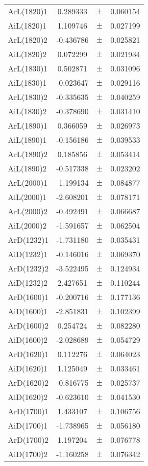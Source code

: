 \begin{table}
\begin{tiny}
\begin{tabular}{lccc}
ArL(1820)1 & 0.289333 & $\pm$ & 0.060154 \\
AiL(1820)1 & 1.109746 & $\pm$ & 0.027199 \\
ArL(1820)2 & -0.436786 & $\pm$ & 0.025821 \\
AiL(1820)2 & 0.072299 & $\pm$ & 0.021934 \\
ArL(1830)1 & 0.502871 & $\pm$ & 0.031096 \\
AiL(1830)1 & -0.023647 & $\pm$ & 0.029116 \\
ArL(1830)2 & -0.335635 & $\pm$ & 0.040259 \\
AiL(1830)2 & -0.378690 & $\pm$ & 0.031410 \\
ArL(1890)1 & 0.366059 & $\pm$ & 0.026973 \\
AiL(1890)1 & -0.156186 & $\pm$ & 0.039533 \\
ArL(1890)2 & 0.185856 & $\pm$ & 0.053414 \\
AiL(1890)2 & -0.517338 & $\pm$ & 0.023202 \\
ArL(2000)1 & -1.199134 & $\pm$ & 0.084877 \\
AiL(2000)1 & -2.608201 & $\pm$ & 0.078171 \\
ArL(2000)2 & -0.492491 & $\pm$ & 0.066687 \\
AiL(2000)2 & -1.591657 & $\pm$ & 0.062504 \\
ArD(1232)1 & -1.731180 & $\pm$ & 0.035431 \\
AiD(1232)1 & -0.146016 & $\pm$ & 0.069370 \\
ArD(1232)2 & -3.522495 & $\pm$ & 0.124934 \\
AiD(1232)2 & 2.427651 & $\pm$ & 0.110244 \\
ArD(1600)1 & -0.200716 & $\pm$ & 0.177136 \\
AiD(1600)1 & -2.851831 & $\pm$ & 0.102399 \\
ArD(1600)2 & 0.254724 & $\pm$ & 0.082280 \\
AiD(1600)2 & -2.028689 & $\pm$ & 0.054729 \\
ArD(1620)1 & 0.112276 & $\pm$ & 0.064023 \\
AiD(1620)1 & 1.125049 & $\pm$ & 0.033461 \\
ArD(1620)2 & -0.816775 & $\pm$ & 0.025737 \\
AiD(1620)2 & -0.623610 & $\pm$ & 0.041530 \\
ArD(1700)1 & 1.433107 & $\pm$ & 0.106756 \\
AiD(1700)1 & -1.738965 & $\pm$ & 0.056180 \\
ArD(1700)2 & 1.197204 & $\pm$ & 0.076778 \\
AiD(1700)2 & -1.160258 & $\pm$ & 0.076342 \\
\bottomrule
\end{tabular}
\end{tiny}
\end{table}

\clearpage